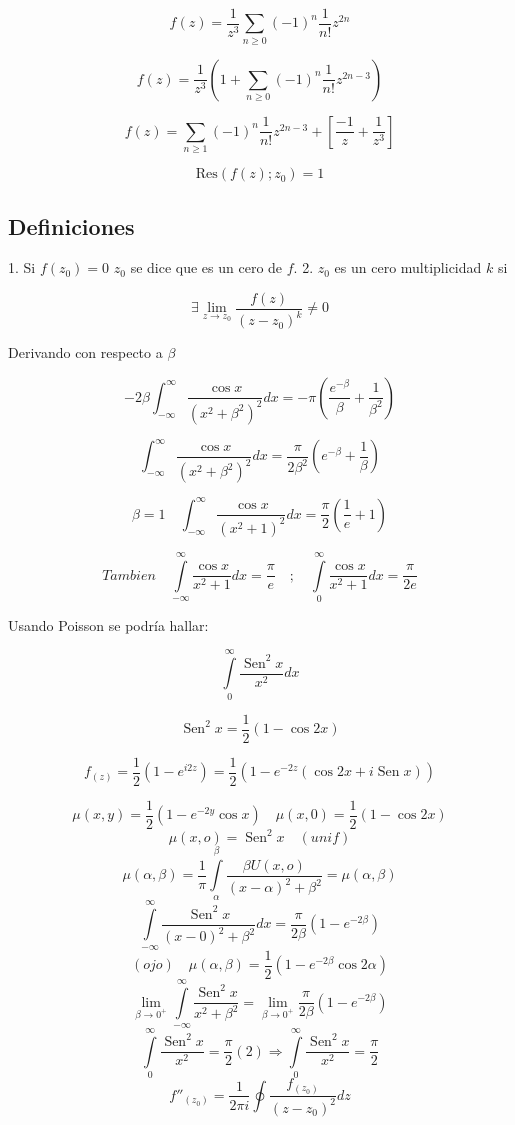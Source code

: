 \documentclass[a4paper,12pt]{article}
\begin{document}
\[
f(z) = \frac{1}{z^3} \sum_{n \geq 0} (-1)^n \frac{1}{n!} z^{2n}
\]

\[
f(z) = \frac{1}{z^3} \left( 1 + \sum_{n \geq 0} (-1)^n \frac{1}{n!} z^{2n - 3} \right)
\]

\[
f(z) = \sum_{n \geq 1} (-1)^n \frac{1}{n!} z^{2n - 3} + \left[ \frac{-1}{z} + \frac{1}{z^3} \right]
\]

\[
\text{Res} (f(z); z_0) = 1
\]

\subsection{Definiciones}

1. Si $f(z_0) = 0$ \quad $z_0$ se dice que es un cero de $f$.
2. $z_0$ es un cero multiplicidad $k$ si

\[
\exists \lim_{z \to z_0} \frac{f(z)}{(z - z_0)^k} \neq 0
\]

Derivando con respecto a $\beta$

\[
-2 \beta \int_{-\infty}^{\infty} \frac{\cos x}{(x^2 + \beta^2)^2} dx = -\pi \left( \frac{e^{-\beta}}{\beta} + \frac{1}{\beta^2} \right)
\]

\[
\int_{-\infty}^{\infty} \frac{\cos x}{(x^2 + \beta^2)^2} dx = \frac{\pi}{2 \beta^2} \left( e^{-\beta} + \frac{1}{\beta} \right)
\]

\[
\beta = 1 \quad \int_{-\infty}^{\infty} \frac{\cos x}{(x^2 + 1)^2} dx = \frac{\pi}{2} \left( \frac{1}{e} + 1 \right)
\]





\[
Tambien \quad \int\limits_{-\infty}^{\infty} \frac{\cos x}{x^2 + 1} dx = \frac{\pi}{e} \quad ; \quad \int\limits_{0}^{\infty} \frac{\cos x}{x^2 + 1} dx = \frac{\pi}{2e}
\]

Usando Poisson se podría hallar:

\[
\int\limits_{0}^{\infty} \frac{\operatorname{Sen}^2 x}{x^2} dx
\]

\[
\operatorname{Sen}^2 x = \frac{1}{2} (1 - \cos 2x)
\]

\[
f_{(z)} = \frac{1}{2} \left(1 - e^{i2z}\right) = \frac{1}{2} \left(1 - e^{-2z} (\cos 2x + i \operatorname{Sen} x)\right)
\]

\[
\mu(x, y) = \frac{1}{2} \left(1 - e^{-2y} \cos x\right) \quad \mu(x, 0) = \frac{1}{2} (1 - \cos 2x)
\]
\[
\mu(x, o) = \operatorname{Sen}^2 x \quad (unif)
\]
\[
\mu(\alpha, \beta) = \frac{1}{\pi} \int\limits_{\alpha}^{\beta} \frac{\beta U(x, o)}{(x - \alpha)^2 + \beta^2} = \mu(\alpha, \beta)
\]
\[
\int\limits_{- \infty}^{\infty} \frac{\operatorname{Sen}^2 x}{(x - 0)^2 + \beta^2} dx = \frac{\pi}{2 \beta} \left(1 - e^{-2 \beta}\right)
\]
\[ (ojo) \quad
\mu(\alpha, \beta) = \frac{1}{2} \left(1 - e^{-2 \beta} \cos 2 \alpha\right)
\]
\[
\lim_{\beta \to 0^+} \int\limits_{- \infty}^{\infty} \frac{\operatorname{Sen}^2 x}{x^2 + \beta^2} = \lim_{\beta \to 0^+} \frac{\pi}{2 \beta} \left(1 - e^{-2 \beta}\right)
\]
\[
\int\limits_{0}^{\infty} \frac{\operatorname{Sen}^2 x}{x^2} = \frac{\pi}{2} (2) \Rightarrow \int\limits_{0}^{\infty} \frac{\operatorname{Sen}^2 x}{x^2} = \frac{\pi}{2}
\]
\[
f''_{(z_0)} = \frac{1}{2 \pi i} \oint \frac{f_{(z_0)}}{(z - z_0)^2} dz
\]
\end{document}
